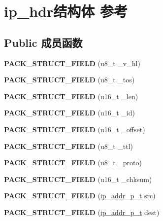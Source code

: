 \hypertarget{structip__hdr}{}\section{ip\+\_\+hdr结构体 参考}
\label{structip__hdr}
\subsection*{Public 成员函数}
\begin{DoxyCompactItemize}
\item 
\mbox{\label{structip__hdr_a3771205bedd041beecba117555fe7db2}} 
{\bfseries P\+A\+C\+K\+\_\+\+S\+T\+R\+U\+C\+T\+\_\+\+F\+I\+E\+LD} (u8\+\_\+t \+\_\+v\+\_\+hl)
\item 
\mbox{\label{structip__hdr_a195bbde7bb79a904deb4a9b2f6da9ee2}} 
{\bfseries P\+A\+C\+K\+\_\+\+S\+T\+R\+U\+C\+T\+\_\+\+F\+I\+E\+LD} (u8\+\_\+t \+\_\+tos)
\item 
\mbox{\label{structip__hdr_aa3905f2613b3ce0994d3a04cf22ce2d7}} 
{\bfseries P\+A\+C\+K\+\_\+\+S\+T\+R\+U\+C\+T\+\_\+\+F\+I\+E\+LD} (u16\+\_\+t \+\_\+len)
\item 
\mbox{\label{structip__hdr_a6d3aca5e6bdd354c377836c67d93575b}} 
{\bfseries P\+A\+C\+K\+\_\+\+S\+T\+R\+U\+C\+T\+\_\+\+F\+I\+E\+LD} (u16\+\_\+t \+\_\+id)
\item 
\mbox{\label{structip__hdr_a2c93d9f414cb5e3bd727799393b3688a}} 
{\bfseries P\+A\+C\+K\+\_\+\+S\+T\+R\+U\+C\+T\+\_\+\+F\+I\+E\+LD} (u16\+\_\+t \+\_\+offset)
\item 
\mbox{\label{structip__hdr_a0d402789ed4488b5538e276b117bfbd1}} 
{\bfseries P\+A\+C\+K\+\_\+\+S\+T\+R\+U\+C\+T\+\_\+\+F\+I\+E\+LD} (u8\+\_\+t \+\_\+ttl)
\item 
\mbox{\label{structip__hdr_a4fb16bde7f441a14cc673fe12289153f}} 
{\bfseries P\+A\+C\+K\+\_\+\+S\+T\+R\+U\+C\+T\+\_\+\+F\+I\+E\+LD} (u8\+\_\+t \+\_\+proto)
\item 
\mbox{\label{structip__hdr_a620275dbd7f7b8f02cf3f90fa035eb62}} 
{\bfseries P\+A\+C\+K\+\_\+\+S\+T\+R\+U\+C\+T\+\_\+\+F\+I\+E\+LD} (u16\+\_\+t \+\_\+chksum)
\item 
\mbox{\label{structip__hdr_a5d6152fc140e12c611356c54147e91e1}} 
{\bfseries P\+A\+C\+K\+\_\+\+S\+T\+R\+U\+C\+T\+\_\+\+F\+I\+E\+LD} (\hyperlink{structip__addr__packed}{ip\+\_\+addr\+\_\+p\+\_\+t} src)
\item 
\mbox{\label{structip__hdr_a7e0bc4d66ad8a63251fd83c7168077a3}} 
{\bfseries P\+A\+C\+K\+\_\+\+S\+T\+R\+U\+C\+T\+\_\+\+F\+I\+E\+LD} (\hyperlink{structip__addr__packed}{ip\+\_\+addr\+\_\+p\+\_\+t} dest)
\end{DoxyCompactItemize}
